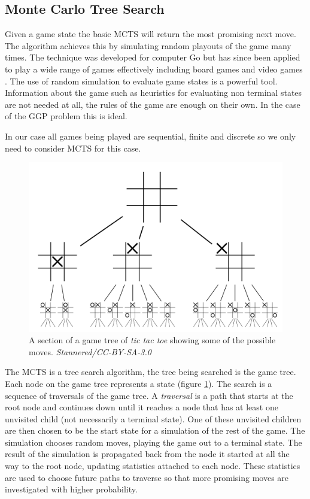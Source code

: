 \subsection{Monte Carlo Tree Search}
Given a game state the basic MCTS will return the most promising next move. The algorithm achieves this by simulating random playouts of the game many times. The technique was developed for computer Go but has since been applied to play a wide range of games effectively including board games and video games \cite{Silver/MCTS,Chaslot/MCTS}. The use of random simulation to evaluate game states is a powerful tool. Information about the game such as heuristics for evaluating non terminal states are not needed at all, the rules of the game are enough on their own. In the case of the GGP problem this is ideal.

In our case all games being played are sequential, finite and discrete so we only need to consider MCTS for this case.

\begin{figure}[ht]
	\centering
	\includegraphics[width=0.9\linewidth]{Tic-tac-toe-game-tree.png}
	\caption{A section of a game tree of \textit{tic tac toe} showing some of the possible moves. \textit{Stannered/CC-BY-SA-3.0}}
	\label{fig:game-tree}
\end{figure}

The MCTS is a tree search algorithm, the tree being searched is the game tree. Each node on the game tree represents a state (figure \ref{fig:game-tree}). The search is a sequence of traversals of the game tree. A \textit{traversal} is a path that starts at the root node and continues down until it reaches a node that has at least one unvisited child (not necessarily a terminal state). One of these unvisited children are then chosen to be the start state for a simulation of the rest of the game. The simulation chooses random moves, playing the game out to a terminal state. The result of the simulation is propagated back from the node it started at all the way to the root node, updating statistics attached to each node. These statistics are used to choose future paths to traverse so that more promising moves are investigated with higher probability.

